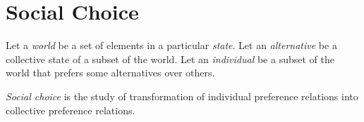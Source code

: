 

\section{Social Choice}

Let a \emph{world} be a set of elements in a particular \emph{state}. Let an
\emph{alternative} be a collective state of a subset of the world. Let an
\emph{individual} be a subset of the world that prefers some alternatives over
others.

\emph{Social choice} is the study of transformation of individual preference
relations into collective preference relations.

